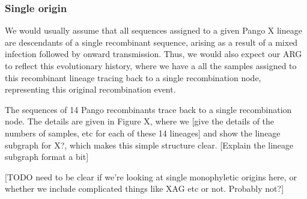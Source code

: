 \documentclass{article}
\begin{document}



\subsubsection{Single origin}

We would usually assume that all sequences assigned to a given Pango X
lineage are descendants of a single recombinant sequence, arising as a
result of a mixed infection followed by onward transmission. Thus, we
would also expect our ARG to reflect this evolutionary history, where
we have a all the samples assigned to this recombinant lineage tracing
back to a single recombination node, representing this original
recombination event.

The sequences of 14 Pango recombinants trace back to a single recombination
node. The details are given in Figure X, where we [give the details of
the numbers of samples, etc for each of these 14 lineages] and
show the lineage subgraph for X?, which makes this simple structure
clear. [Explain the lineage subgraph format a bit]

[TODO need to be clear if we're looking at single monophyletic origins
here, or whether we include complicated things like XAG etc or not.
Probably not?]

\end{document}
